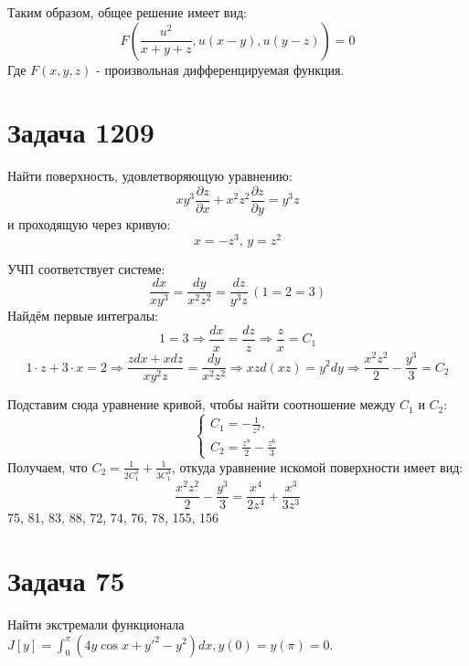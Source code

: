 \documentclass[11pt]{article}
\begin{document}
Таким образом, общее решение имеет вид:
$$F\left(\frac{u^2}{x + y + z}, u(x - y), u(y - z)\right) = 0$$
Где \(F(x, y, z)\) - произвольная дифференцируемая функция.

\section{Задача 1209}
\label{sec:org74c36a6}
Найти поверхность, удовлетворяющую уравнению:
$$xy^3\frac{\partial{z}}{\partial{x}} + x^2z^2\frac{\partial{z}}{\partial{y}} = y^3z$$
и проходящую через кривую:
$$x = -z^3, \, y = z^2$$

УЧП соответствует системе:
$$\frac{dx}{xy^3} = \frac{dy}{x^2z^2} = \frac{dz}{y^3z} \, (1 = 2 = 3)$$
Найдём первые интегралы:
$$1 = 3 \Rightarrow \frac{dx}{x} = \frac{dz}{z} \Rightarrow \frac{z}{x} = C_1$$
$$1 \cdot z + 3 \cdot x = 2 \Rightarrow \frac{zdx + xdz}{xy^2z} = \frac{dy}{x^2z^2} \Rightarrow xzd(xz) = y^2dy \Rightarrow \frac{x^2z^2}{2} - \frac{y^3}{3} = C_2$$

Подставим сюда уравнение кривой, чтобы найти соотношение между \(C_1\) и \(C_2\):
\begin{equation*}
  \begin{cases}
    C_1 = -\frac{1}{z^2},\\
    C_2 = \frac{z^8}{2} - \frac{z^6}{3}
  \end{cases}
\end{equation*}
Получаем, что \(C_2 = \frac{1}{2C_1^4} + \frac{1}{3C_1^3}\), откуда уравнение искомой поверхности имеет вид:
$$\frac{x^2z^2}{2} - \frac{y^3}{3} = \frac{x^4}{2z^4} + \frac{x^3}{3z^3}$$
75, 81, 83, 88, 72, 74, 76, 78, 155, 156
\section{Задача 75}
\label{sec:orge1cd657}
Найти экстремали функционала \(J[y] = \int_0^\pi(4y\cos x + y'^2 - y^2)dx, y(0) = y(\pi) = 0\).
\end{document}
